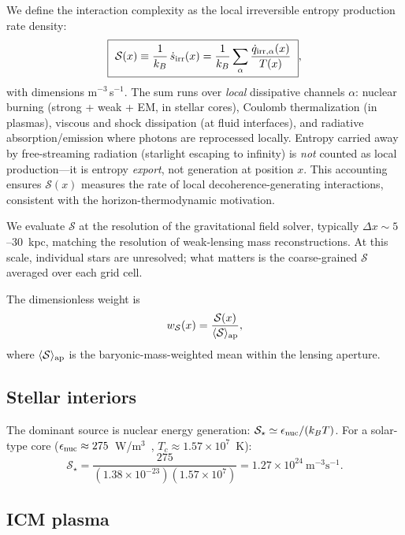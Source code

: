 \documentclass[aps,prd,twocolumn,superscriptaddress,nofootinbib]{revtex4-2}
\newcommand{\wS}{w_{\mathcal{S}}}
\newcommand{\Ssrc}{\mathcal{S}}
\begin{document}
We define the interaction complexity as the local irreversible entropy production rate density:
\begin{equation}
\boxed{\ \Ssrc(x)\equiv\frac{1}{k_B}\,\dot{s}_{\rm irr}(x)=\frac{1}{k_B}\sum_\alpha\frac{\dot{q}_{{\rm irr},\alpha}(x)}{T(x)}\ },
\label{eq:Sdef}
\end{equation}
with dimensions m$^{-3}$\,s$^{-1}$. The sum runs over \emph{local} dissipative channels $\alpha$: nuclear burning (strong + weak + EM, in stellar cores), Coulomb thermalization (in plasmas), viscous and shock dissipation (at fluid interfaces), and radiative absorption/emission where photons are reprocessed locally. Entropy carried away by free-streaming radiation (starlight escaping to infinity) is \emph{not} counted as local production---it is entropy \emph{export}, not generation at position $x$. This accounting ensures $\Ssrc(x)$ measures the rate of local decoherence-generating interactions, consistent with the horizon-thermodynamic motivation.

We evaluate $\Ssrc$ at the resolution of the gravitational field solver, typically $\Delta x\sim 5$--$30$~kpc, matching the resolution of weak-lensing mass reconstructions. At this scale, individual stars are unresolved; what matters is the coarse-grained $\Ssrc$ averaged over each grid cell.

The dimensionless weight is
\begin{equation}
\wS(x)=\frac{\Ssrc(x)}{\langle\Ssrc\rangle_{\rm ap}},
\label{eq:wSdef}
\end{equation}
where $\langle\Ssrc\rangle_{\rm ap}$ is the baryonic-mass-weighted mean within the lensing aperture.

\subsection{Stellar interiors}

The dominant source is nuclear energy generation: $\Ssrc_\star\simeq\epsilon_{\rm nuc}/(k_B T)$. For a solar-type core ($\epsilon_{\rm nuc}\approx 275$~W/m$^3$~\cite{Bahcall2005}, $T_c\approx 1.57\times 10^7$~K):
\begin{equation}
\Ssrc_\star=\frac{275}{(1.38\times 10^{-23})(1.57\times 10^7)}=1.27\times 10^{24}~\text{m}^{-3}\text{s}^{-1}.
\label{eq:Sstar}
\end{equation}

\subsection{ICM plasma}
\end{document}
